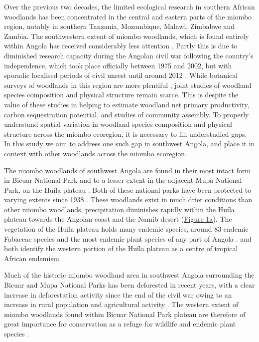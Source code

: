 \begin{refsection}
Over the previous two decades, the limited ecological research in southern African woodlands has been concentrated in the central and eastern parts of the miombo region, notably in southern Tanzania, Mozambique, Malawi, Zimbabwe and Zambia. The southwestern extent of miombo woodlands, which is found entirely within Angola has received considerably less attention \citep{Huntley2019}. Partly this is due to diminished research capacity during the Angolan civil war following the country's independence, which took place officially between 1975 and 2002, but with sporadic localised periods of civil unrest until around 2012 \citep{Oliveira2015}. While botanical surveys of woodlands in this region are more plentiful \citep{Huntley2019, Figueiredo2009}, joint studies of woodland species composition and physical structure remain scarce. This is despite the value of these studies in helping to estimate woodland net primary productivity, carbon sequestration potential, and studies of community assembly. To properly understand spatial variation in woodland species composition and physical structure across the miombo ecoregion, it is necessary to fill understudied gaps. In this study we aim to address one such gap in southwest Angola, and place it in context with other woodlands across the miombo ecoregion.

The miombo woodlands of southwest Angola are found in their most intact form in Bicuar National Park and to a lesser extent in the adjacent Mupa National Park, on the Hu\'{i}la plateau \citep{Chisingui2018}. Both of these national parks have been protected to varying extents since 1938 \cite{Huntley2019}. These woodlands exist in much drier conditions than other miombo woodlands, precipitation diminishes rapidly within the Hu\'{i}la plateau towards the Angolan coast and the Namib desert (\hyperref[plot_map]{Figure 1a}). The vegetation of the Hu\'{i}la plateau holds many endemic species, around 83 endemic Fabaceae species \citep{Soares2007} and the most endemic plant species of any part of Angola \citep{Figueiredo2008}. \citet{Linder2001} and \citet{Droissart2018} both identify the western portion of the Hu\'{i}la plateau as a centre of tropical African endemism.

Much of the historic miombo woodland area in southwest Angola surrounding the Bicuar and Mupa National Parks has been deforested in recent years, with a clear increase in deforestation activity since the end of the civil war owing to an increase in rural population and agricultural activity \citep{Schneibel2013, Huntley2019}. The western extent of miombo woodlands found within Bicuar National Park plateau are therefore of great importance for conservation as a refuge for wildlife and endemic plant species \citep{Huntley2019}.


\end{refsection}

